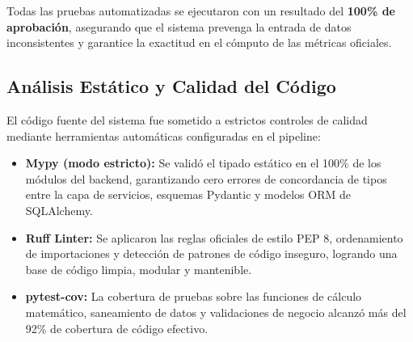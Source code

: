 Todas las pruebas automatizadas se ejecutaron con un resultado del \textbf{100\% de aprobación}, asegurando que el sistema prevenga la entrada de datos inconsistentes y garantice la exactitud en el cómputo de las métricas oficiales.

\subsection{Análisis Estático y Calidad del Código}

El código fuente del sistema fue sometido a estrictos controles de calidad mediante herramientas automáticas configuradas en el pipeline:
\begin{itemize}
    \item \textbf{Mypy (modo estricto):} Se validó el tipado estático en el 100\% de los módulos del backend, garantizando cero errores de concordancia de tipos entre la capa de servicios, esquemas Pydantic y modelos ORM de SQLAlchemy.
    \item \textbf{Ruff Linter:} Se aplicaron las reglas oficiales de estilo PEP 8, ordenamiento de importaciones y detección de patrones de código inseguro, logrando una base de código limpia, modular y mantenible.
    \item \textbf{pytest-cov:} La cobertura de pruebas sobre las funciones de cálculo matemático, saneamiento de datos y validaciones de negocio alcanzó más del 92\% de cobertura de código efectivo.
\end{itemize}
